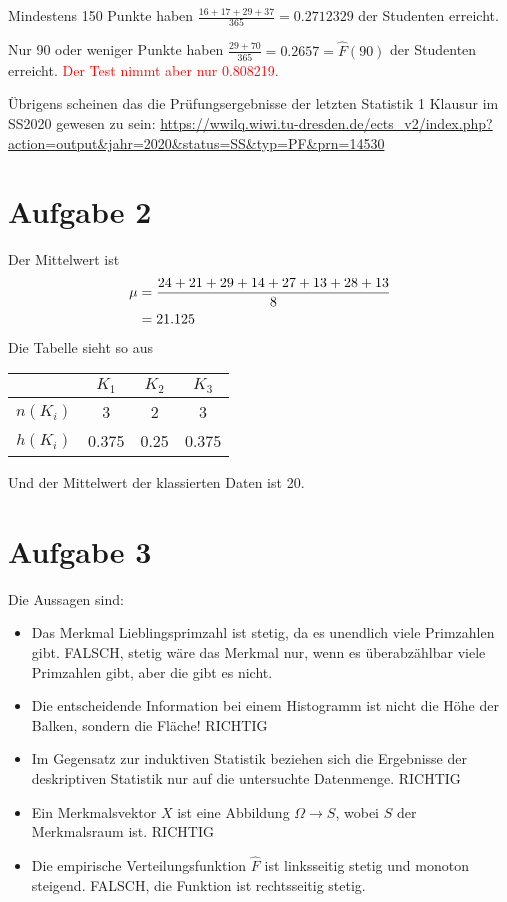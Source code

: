 \documentclass{article}
\begin{document}
	 Mindestens 150 Punkte haben $\frac{16+17+29+37}{365}=0.2712329$ der Studenten erreicht.
	 
	 Nur 90 oder weniger Punkte haben $\frac{29+70}{365}=0.2657 = \hat{F}(90)$ der Studenten erreicht. \textcolor{red}{Der Test nimmt aber nur 0.808219.}
	 
	 Übrigens scheinen das die Prüfungsergebnisse der letzten Statistik 1 Klausur im SS2020 gewesen zu sein: \url{https://wwilq.wiwi.tu-dresden.de/ects_v2/index.php?action=output\&jahr=2020\&status=SS\&typ=PF\&prn=14530}

	\section*{Aufgabe 2}
	Der Mittelwert ist
	\begin{align}
		\mu &= \frac{24+21+29+14+27+13+28+13}{8} \notag \\
		&= 21.125 \notag
	\end{align}
	Die Tabelle sieht so aus
	\begin{center}
		\begin{tabular}{c|c|c|c}
			 & $K_1$ & $K_2$ & $K_3$ \\
			 \hline
			 $n(K_i)$ & 3 & 2 & 3 \\
			 \hline
			 $h(K_i)$ & 0.375 & 0.25 & 0.375
		\end{tabular}
	\end{center}
	Und der Mittelwert der klassierten Daten ist 20.

	\section*{Aufgabe 3}
	Die Aussagen sind:
	\begin{itemize}
		\item Das Merkmal Lieblingsprimzahl ist stetig, da es unendlich viele Primzahlen gibt. FALSCH, stetig wäre das Merkmal nur, wenn es überabzählbar viele Primzahlen gibt, aber die gibt es nicht.
		\item Die entscheidende Information bei einem Histogramm ist nicht die Höhe der Balken, sondern die Fläche! RICHTIG
		\item Im Gegensatz zur induktiven Statistik beziehen sich die Ergebnisse der deskriptiven Statistik nur auf die untersuchte Datenmenge. RICHTIG
		\item Ein Merkmalsvektor $X$ ist eine Abbildung $\Omega\to S$, wobei $S$ der Merkmalsraum ist. RICHTIG
		\item Die empirische Verteilungsfunktion $\hat{F}$ ist linksseitig stetig und monoton steigend. FALSCH, die Funktion ist rechtsseitig stetig.
	\end{itemize}
\end{document}
